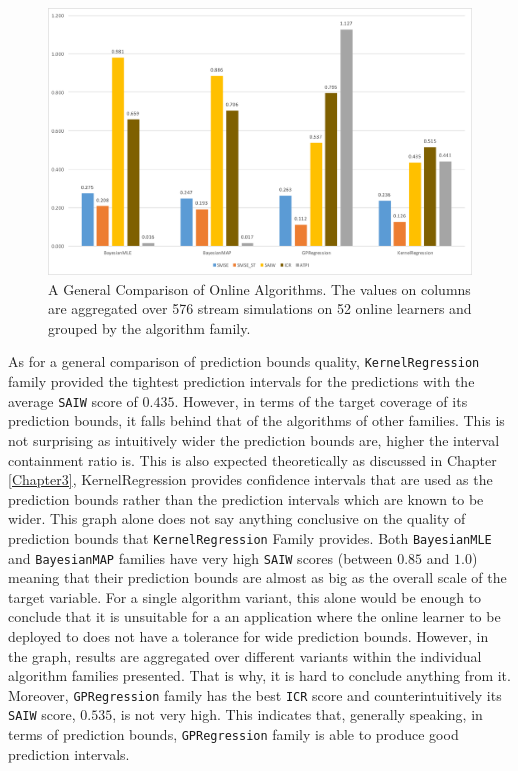 \begin{figure}[htbp]
  \centering
    \includegraphics[width=\linewidth]{./Figures/gen_alg_comparison.pdf}
  \caption{A General Comparison of Online Algorithms. The values on columns are aggregated over 576 stream simulations on 52 online learners and grouped by the algorithm family.}
  \label{fig:gen_alg_comparison}
\end{figure}

As for a general comparison of prediction bounds quality, \texttt{KernelRegression} family provided the tightest prediction intervals for the predictions with the average \texttt{SAIW} score of $0.435$. However, in terms of the target coverage of its prediction bounds, it falls behind that of the algorithms of other families. This is not surprising as intuitively wider the prediction bounds are, higher the interval containment ratio is. This is also expected theoretically as discussed in Chapter \ref{Chapter3}, KernelRegression provides confidence intervals that are used as the prediction bounds rather than the prediction intervals which are known to be wider. This graph alone does not say anything conclusive on the quality of prediction bounds that \texttt{KernelRegression} Family provides. Both \texttt{BayesianMLE} and \texttt{BayesianMAP} families have very high \texttt{SAIW} scores (between $0.85$ and $1.0$) meaning that their prediction bounds are almost as big as the overall scale of the target variable. For a single algorithm variant, this alone would be enough to conclude that it is unsuitable for a an application where the online learner to be deployed to does not have a tolerance for wide prediction bounds. However, in the graph, results are aggregated over different variants within the individual algorithm families presented. That is why, it is hard to conclude anything from it. Moreover, \texttt{GPRegression} family has the best \texttt{ICR} score and counterintuitively its \texttt{SAIW} score, $0.535$, is not very high. This indicates that, generally speaking, in terms of prediction bounds, \texttt{GPRegression} family is able to produce good prediction intervals.


